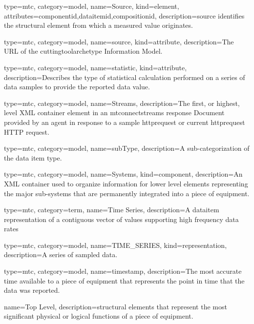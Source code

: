 {
  type=mtc,
  category=model,
  name={Source},
  kind={element},
  attributes={\gls{componentid},\gls{dataitemid},\gls{compositionid}},
  description={\gls{source} identifies the \gls{structural element} from which a measured value originates.}
}

{
  type=mtc,
  category=model,
  name={source},
  kind={attribute},
  description={The URL of the \gls{cuttingtoolarchetype} Information Model.}
}

{
  type=mtc,
  category=model,
  name={statistic},
  kind={attribute},
  description={Describes the type of statistical calculation performed on a series of data samples to provide the reported data value.}
}


{
  type=mtc,
  category=model,
  name={Streams},
  description={The first, or highest, level XML container element in an \gls{mtconnectstreams} \gls{response} Document provided by an \gls{agent} in response to a \gls{sample httprequest} or \gls{current httprequest} HTTP \gls{request}.}
}


{
  type=mtc,
  category=model,
  name={subType},
  description={A sub-categorization of the data item \gls{type}.}
}


{
  type=mtc,
  category=model,
  name={Systems},
  kind={component},
  description={An XML container used to organize information for \gls{lower level} elements representing the major sub-systems that are permanently integrated into a piece of equipment.}
}


{
  type=mtc,
  category=term,
  name={Time Series},
  description={A \gls{dataitem} representation of a contiguous vector of values supporting high frequency data rates}
}


{
  type=mtc,
  category=model,
  name={TIME\_SERIES},
  kind={representation},
  description={A series of sampled data. }
}


{
  type=mtc,
  category=model,
  name={timestamp},
  description={The most accurate time available to a piece of equipment that represents the point in time that the data was reported.}
}


{
  name={Top Level},
  description={\glspl{structural element} that represent the most significant physical or logical functions of a piece of equipment.}
}



